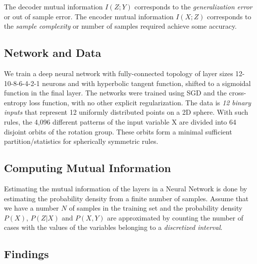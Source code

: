 \documentclass[11pt]{article}
\begin{document}
The decoder mutual information $I(Z;Y)$ corresponds to the \emph{generalization error} or out of sample error. The encoder mutual information $I(X;Z)$ corresponds to the \emph{sample complexity} or number of samples required achieve some accuracy.

\subsection*{Network and Data}

We train a deep neural network with fully-connected topology of layer sizes 12-10-8-6-4-2-1 neurons and with hyperbolic tangent function, shifted to a sigmoidal function in the final layer. The networks were trained using SGD and the cross-entropy loss function, with no other explicit regularization.
The data is \emph{12 binary inputs} that represent 12 uniformly distributed points on a 2D sphere. With such rules, the 4,096 different patterns of the input variable X are divided into 64 disjoint orbits of the rotation group. These orbits form a minimal sufficient partition/statistics for spherically symmetric rules.

\subsection*{Computing Mutual Information}

Estimating the mutual information of the layers in a Neural Network is done by estimating the probability density from a finite number of samples. Assume that we have a number $N$ of samples in the training set and the probability density $P(X)$, $P(Z\vert X)$ and $P(X,Y)$ are approximated by counting the number of cases with the values of the variables belonging to a \emph{discretized interval}.

\subsection*{Findings}
\end{document}
